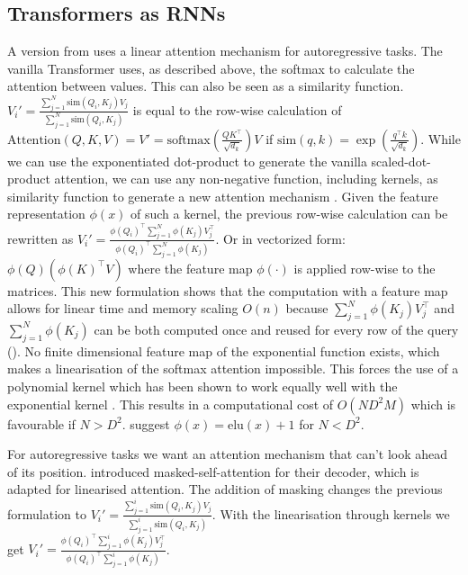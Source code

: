 \documentclass[]{krantz}
\begin{document}
\hypertarget{transformers-as-rnns}{%
\subsection{Transformers as RNNs}\label{transformers-as-rnns}}

A version from \citet{katharopoulos2020transformers} uses a linear attention mechanism for
autoregressive tasks. The vanilla Transformer uses, as described above, the softmax to
calculate the attention between values. This can also be seen as a similarity function.
\(V_i' = \frac{\sum_{j=1}^N \text{sim}(Q_i, K_j)V_j}{\sum_{j=1}^N\text{sim}(Q_i, K_j)}\) is equal to
the row-wise calculation of \(\text{Attention}(Q,K,V) = V' = \text{softmax}(\frac{QK^\top}{\sqrt{d_k}})V\)
if \(\text{sim}(q,k)=\exp(\frac{q^\top k}{\sqrt{d_k}})\). While we can use the exponentiated
dot-product to generate the vanilla scaled-dot-product attention, we can use any non-negative
function, including kernels, as similarity function to generate a new attention mechanism \citet{katharopoulos2020transformers}.
Given the feature representation \(\phi(x)\) of such a kernel, the previous row-wise calculation
can be rewritten as \(V_i' = \frac{\phi(Q_i)^\top \sum_{j=1}^N\phi(K_j)V_j^\top}{\phi(Q_i)^\top \sum_{j=1}^N\phi(K_j)}\).
Or in vectorized form: \(\phi(Q)(\phi(K)^\top V)\) where the feature map \(\phi(\cdot)\) is applied row-wise to the matrices.
This new formulation shows that the computation with a feature map allows for linear time and memory scaling \(O(n)\)
because \(\sum_{j=1}^N\phi(K_j)V_j^\top\) and \(\sum_{j=1}^N\phi(K_j)\) can be both computed once and reused for every
row of the query (\citet{katharopoulos2020transformers}).
No finite dimensional feature map of the exponential function exists, which makes a linearisation of the
softmax attention impossible. This forces the use of a polynomial kernel which has been shown to work equally well with
the exponential kernel \citet{tsai2019transformer}. This results in a computational cost of
\(O(ND^2M)\) which is favourable if \(N > D^2\). \citet{katharopoulos2020transformers} suggest \(\phi(x) = \text{elu}(x) + 1\) for \(N < D^2\).

For autoregressive tasks we want an attention mechanism that can't look ahead of its position.
\citet{vaswani2017attention} introduced masked-self-attention for their decoder, which is adapted for linearised attention.
The addition of masking changes the previous formulation to \(V_i' = \frac{\sum_{j=1}^i \text{sim}(Q_i, K_j)V_j}{\sum_{j=1}^i\text{sim}(Q_i, K_j)}\).
With the linearisation through kernels we get \(V_i' = \frac{\phi(Q_i)^\top \sum_{j=1}^i\phi(K_j)V_j^\top}{\phi(Q_i)^\top \sum_{j=1}^i\phi(K_j)}\).
\end{document}
